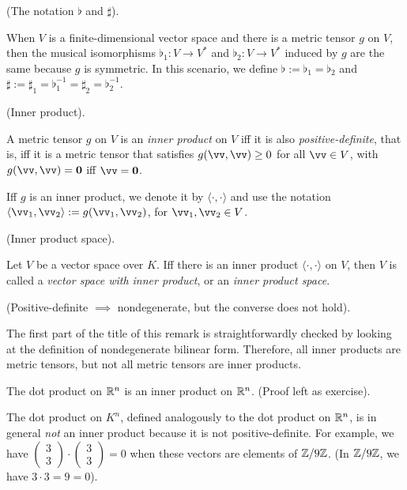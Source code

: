 \begin{defn}
    (The notation $\flat$ and $\sharp$).
    
    When $V$ is a finite-dimensional vector space and there is a metric tensor $g$ on $V$, then the musical isomorphisms ${\flat_1:V \rightarrow V^*}$ and ${\flat_2:V \rightarrow V^*}$ induced by $g$ are the same because $g$ is symmetric. In this scenario, we define $\flat := \flat_1 = \flat_2$ and $\sharp := \sharp_1 = \flat_1^{-1} = \sharp_2 = \flat_2^{-1}$.
\end{defn}

\begin{defn}
    (Inner product).
    
    A metric tensor $g$ on $V$ is an \textit{inner product} on $V$ iff it is also \textit{positive-definite}, that is, iff it is a metric tensor that satisfies $g(\vv, \vv) \geq 0$ for all $\vv \in V$, with $g(\vv, \vv) = \mathbf{0}$ iff $\vv = \mathbf{0}$.
    
    Iff $g$ is an inner product, we denote it by $\langle \cdot, \cdot \rangle$ and use the notation $\langle \vv_1, \vv_2 \rangle := g(\vv_1, \vv_2)$, for $\vv_1, \vv_2 \in V$.
\end{defn}

\begin{defn}
    (Inner product space).
    
    Let $V$ be a vector space over $K$. Iff there is an inner product $\langle \cdot, \cdot \rangle$ on $V$, then $V$ is called a \textit{vector space with inner product}, or an \textit{inner product space}.
\end{defn}

\begin{remark}
    (Positive-definite $\implies$ nondegenerate, but the converse does not hold).
    
    The first part of the title of this remark is straightforwardly checked by looking at the definition of nondegenerate bilinear form. Therefore, all inner products are metric tensors, but not all metric tensors are inner products.
\end{remark}

\begin{example}
    The dot product on $\mathbb{R}^n$ is an inner product on $\mathbb{R}^n$. (Proof left as exercise). 
    
    The dot product on $K^n$, defined analogously to the dot product on $\mathbb{R}^n$, is in general \textit{not} an inner product because it is not positive-definite. For example, we have $\begin{pmatrix} 3 \\ 3 \end{pmatrix} \cdot \begin{pmatrix} 3 \\ 3 \end{pmatrix} = 0$ when these vectors are elements of $\mathbb{Z}/9\mathbb{Z}$. (In $\mathbb{Z}/9\mathbb{Z}$, we have $3 \cdot 3 = 9 = 0$).
\end{example}

